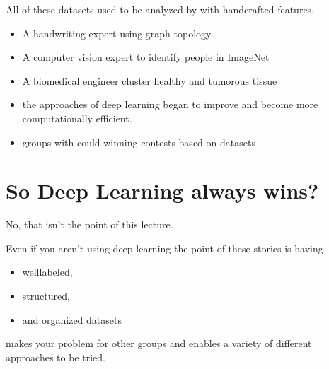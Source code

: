 \documentclass[letterpaper,10pt,english]{sphinxmanual}
\begin{document}
\sphinxAtStartPar
All of these datasets used to be analyzed by  with hand\sphinxhyphen{}crafted features.


\begin{itemize}
\item {} 
\sphinxAtStartPar
A handwriting expert using graph topology

\item {} 
\sphinxAtStartPar
A computer vision expert to identify people in ImageNet

\item {} 
\sphinxAtStartPar
A biomedical engineer cluster healthy and tumorous tissue

\end{itemize}


\begin{itemize}
\item {} 
\sphinxAtStartPar
the approaches of deep learning began to improve and become more computationally efficient.

\item {} 
\sphinxAtStartPar
groups with  could winning contests based on datasets

\end{itemize}






\section{So Deep Learning always wins?}
\label{\detokenize{03-Datasets:so-deep-learning-always-wins}}
\sphinxAtStartPar
No, that isn’t the point of this lecture.

\sphinxAtStartPar
Even if you aren’t using deep learning the point of these stories is having
\begin{itemize}
\item {} 
\sphinxAtStartPar
well\sphinxhyphen{}labeled,

\item {} 
\sphinxAtStartPar
structured,

\item {} 
\sphinxAtStartPar
and organized datasets

\end{itemize}

\sphinxAtStartPar
makes your problem  for other groups and enables a variety of different approaches to be tried.
\end{document}
